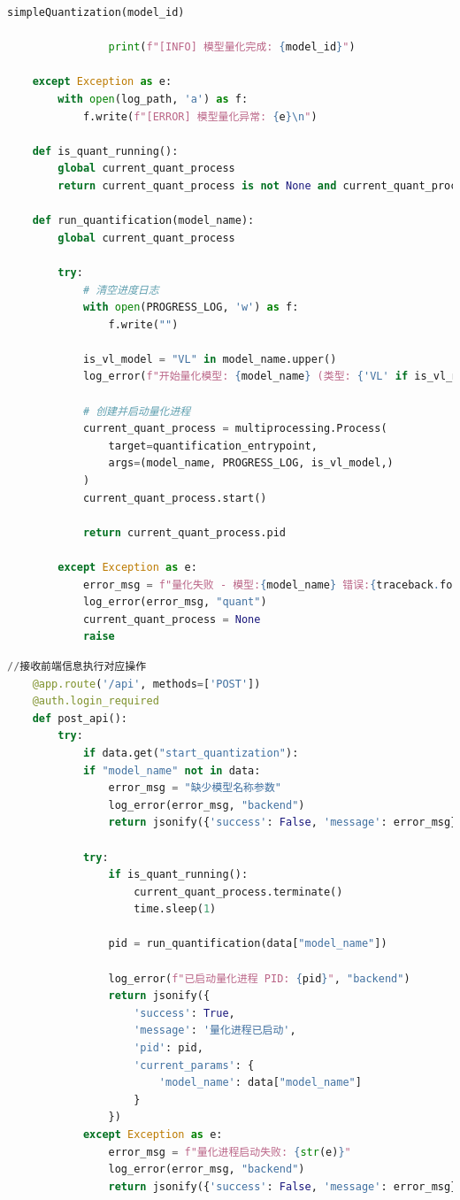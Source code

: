 \documentclass[AutoFakeBold,AutoFakeSlant,language=chinese,degree=bachelor]{sustechthesis}
\begin{document}
\begin{itemize}
\begin{lstlisting}[language=python]
                simpleQuantization(model_id)

                print(f"[INFO] 模型量化完成: {model_id}")

    except Exception as e:
        with open(log_path, 'a') as f:
            f.write(f"[ERROR] 模型量化异常: {e}\n")
    
    def is_quant_running():
        global current_quant_process
        return current_quant_process is not None and current_quant_process.is_alive()
    
    def run_quantification(model_name):
        global current_quant_process
    
        try:
            # 清空进度日志
            with open(PROGRESS_LOG, 'w') as f:
                f.write("")
            
            is_vl_model = "VL" in model_name.upper()
            log_error(f"开始量化模型: {model_name} (类型: {'VL' if is_vl_model else '普通'})", "quant")
    
            # 创建并启动量化进程
            current_quant_process = multiprocessing.Process(
                target=quantification_entrypoint,
                args=(model_name, PROGRESS_LOG, is_vl_model,)
            )
            current_quant_process.start()
    
            return current_quant_process.pid
        
        except Exception as e:
            error_msg = f"量化失败 - 模型:{model_name} 错误:{traceback.format_exc()}"
            log_error(error_msg, "quant")
            current_quant_process = None
            raise
    \end{lstlisting}
    \begin{lstlisting}[language=python]
    //接收前端信息执行对应操作
    @app.route('/api', methods=['POST'])
    @auth.login_required
    def post_api():
        try:
            if data.get("start_quantization"):
            if "model_name" not in data:
                error_msg = "缺少模型名称参数"
                log_error(error_msg, "backend")
                return jsonify({'success': False, 'message': error_msg}), 400
            
            try:
                if is_quant_running():
                    current_quant_process.terminate()
                    time.sleep(1) 
                
                pid = run_quantification(data["model_name"])
                
                log_error(f"已启动量化进程 PID: {pid}", "backend")
                return jsonify({
                    'success': True,
                    'message': '量化进程已启动',
                    'pid': pid,
                    'current_params': {
                        'model_name': data["model_name"]
                    }
                })
            except Exception as e:
                error_msg = f"量化进程启动失败: {str(e)}"
                log_error(error_msg, "backend")
                return jsonify({'success': False, 'message': error_msg}), 500
                

\end{lstlisting}
\end{itemize}
\end{document}
